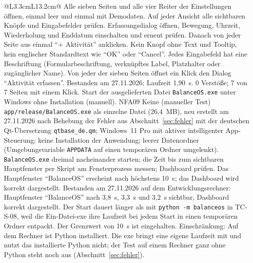 \begin{longtable}{@{}L{3.3cm}L{13.2cm}@{}}
    {Alle sieben Seiten und alle vier Reiter der Einstellungen öffnen, einmal leer und einmal mit Demodaten. Auf jeder Ansicht alle sichtbaren Knöpfe und Eingabefelder prüfen. Erfassungsdialog öffnen, Bewegung, Uhrzeit, Wiederholung und Enddatum einschalten und erneut prüfen. Danach von jeder Seite aus einmal \enquote{+ Aktivität} anklicken.}
    {Kein Knopf ohne Text und Tooltip, kein englischer Standardtext wie \enquote{OK} oder \enquote{Cancel}. Jedes Eingabefeld hat eine Beschriftung (Formularbeschriftung, verknüpftes Label, Platzhalter oder zugänglicher Name). Von jeder der sieben Seiten öffnet ein Klick den Dialog \enquote{Aktivität erfassen}.}
    {Bestanden am 27.11.2026; Laufzeit 1,90~s. 0 Verstöße; 7 von 7 Seiten mit einem Klick.}
  \midrule
    {Start der ausgelieferten Datei \texttt{BalanceOS.exe} unter Windows ohne Installation (manuell).}
    {NFA09}
    {Keine (manueller Test)}
    {\texttt{app/release/BalanceOS.exe} als einzelne Datei (26,4~MB), neu erstellt am 27.11.2026 nach Behebung der Fehler aus Abschnitt~\ref{sec:fehler} mit der deutschen Qt-Übersetzung \texttt{qtbase\_de.qm}; Windows~11 Pro mit aktiver intelligenter App-Steuerung; keine Installation der Anwendung; leerer Datenordner (Umgebungsvariable \texttt{APPDATA} auf einen temporären Ordner umgelenkt).}
    {\texttt{BalanceOS.exe} dreimal nacheinander starten; die Zeit bis zum sichtbaren Hauptfenster per Skript am Fensterprozess messen; Dashboard prüfen.}
    {Das Hauptfenster \enquote{BalanceOS} erscheint nach höchstens 10~s; das Dashboard wird korrekt dargestellt.}
    {Bestanden am 27.11.2026 auf dem Entwicklungsrechner: Hauptfenster \enquote{BalanceOS} nach 3,8~s, 3,3~s und 3,2~s sichtbar, Dashboard korrekt dargestellt. Der Start dauert länger als mit \texttt{python -m balanceos} in TC-S-08, weil die Ein-Datei-exe ihre Laufzeit bei jedem Start in einen temporären Ordner entpackt. Der Grenzwert von 10~s ist eingehalten. Einschränkung: Auf dem Rechner ist Python installiert. Die exe bringt eine eigene Laufzeit mit und nutzt das installierte Python nicht; der Test auf einem Rechner ganz ohne Python steht noch aus (Abschnitt~\ref{sec:fehler}).}
\end{longtable}
\endgroup
{}
